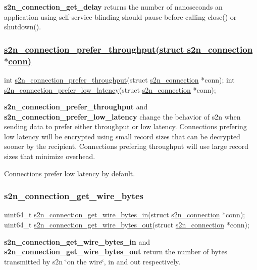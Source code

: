 {\bfseries s2n\+\_\+connection\+\_\+get\+\_\+delay} returns the number of nanoseconds an application using self-\/service blinding should pause before calling close() or shutdown().

\subsubsection*{\hyperlink{s2n__connection_8c_ab242f62c5824c72476844970b1ae7301}{s2n\+\_\+connection\+\_\+prefer\+\_\+throughput(struct s2n\+\_\+connection $\ast$conn)}}


\begin{DoxyCode}
\textcolor{keywordtype}{int} \hyperlink{s2n_8h_ab242f62c5824c72476844970b1ae7301}{s2n\_connection\_prefer\_throughput}(\textcolor{keyword}{struct} 
      \hyperlink{structs2n__connection}{s2n\_connection} *conn);
\textcolor{keywordtype}{int} \hyperlink{s2n_8h_a332427237ca8907196034ac5768a65bf}{s2n\_connection\_prefer\_low\_latency}(\textcolor{keyword}{struct} 
      \hyperlink{structs2n__connection}{s2n\_connection} *conn);
\end{DoxyCode}


{\bfseries s2n\+\_\+connection\+\_\+prefer\+\_\+throughput} and {\bfseries s2n\+\_\+connection\+\_\+prefer\+\_\+low\+\_\+latency} change the behavior of s2n when sending data to prefer either throughput or low latency. Connections prefering low latency will be encrypted using small record sizes that can be decrypted sooner by the recipient. Connections prefering throughput will use large record sizes that minimize overhead.

Connections prefer low latency by default.

\subsubsection*{s2n\+\_\+connection\+\_\+get\+\_\+wire\+\_\+bytes}


\begin{DoxyCode}
uint64\_t \hyperlink{s2n_8h_a4d1194b561c825208d387b4660670b63}{s2n\_connection\_get\_wire\_bytes\_in}(\textcolor{keyword}{struct} 
      \hyperlink{structs2n__connection}{s2n\_connection} *conn);
uint64\_t \hyperlink{s2n_8h_a43ef96c4123345ccc7952a387125409e}{s2n\_connection\_get\_wire\_bytes\_out}(\textcolor{keyword}{struct} 
      \hyperlink{structs2n__connection}{s2n\_connection} *conn);
\end{DoxyCode}


{\bfseries s2n\+\_\+connection\+\_\+get\+\_\+wire\+\_\+bytes\+\_\+in} and {\bfseries s2n\+\_\+connection\+\_\+get\+\_\+wire\+\_\+bytes\+\_\+out} return the number of bytes transmitted by s2n \char`\"{}on the wire\char`\"{}, in and out respectively.

